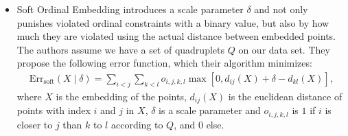 \begin{itemize}
    \item Soft Ordinal Embedding  \citep[SOE,][]{teradaLocalOrdinalEmbedding2014} 
        introduces a scale parameter $\delta$ and not only punishes violated ordinal constraints
        with a binary value, but also by how much they are violated using the
        actual distance between embedded points.
        The authors assume we have a set of quadruplets $Q$ on our data set. 
        They propose the following error function, which their algorithm minimizes:
        \begin{align*}
            \text{Err}_{\text{soft}}(X  \mid  \delta) = \sum_{i<j} \sum_{k<l} o_{i,j,k,l} 
            \max [0, d_{ij}(X) + \delta - d_{kl}(X)]
        ,\end{align*}
        where $X$ is the embedding of the points, $d_{ij}(X)$ is the euclidean distance 
        of points with index $i$ and $j$ in $X$, $\delta$ is a scale parameter and $o_{i,j,k,l}$
        is $1$ if $i$ is closer to $j$ than $k$ to $l$ according to $Q$, and $0$ else.


\end{itemize}
